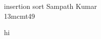 \documentclass[12pt,a4paper] {beamer}
\begin{document}
\begin{frame}{insertion sort}
Sampath Kumar\\
13mcmt49
\end{frame}
\begin{frame}
\begin{algorithmic}
\STATE hi 
\end{algorithmic}
\end{frame}
\begin{frame}
 
\end{frame}
\end{document}
